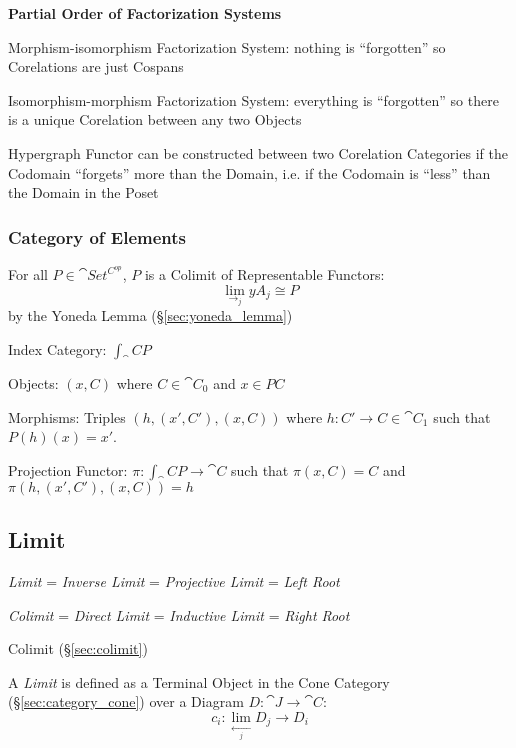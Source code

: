 \textbf{Partial Order of Factorization Systems} %

Morphism-isomorphism Factorization System: nothing is ``forgotten'' so
Corelations are just Cospans

Isomorphism-morphism Factorization System: everything is ``forgotten''
so there is a unique Corelation between any two Objects

Hypergraph Functor can be constructed between two Corelation
Categories if the Codomain ``forgets'' more than the Domain, i.e. if
the Codomain is ``less'' than the Domain in the Poset



\subsubsection{Category of Elements}\label{sec:element_category}

For all $P \in \cat{Set^{C^{op}}}$, $P$ is a Colimit of
Representable Functors:
\[
  \lim_{\rightarrow_j} yA_j \cong P
\]
by the Yoneda Lemma (\S\ref{sec:yoneda_lemma})

Index Category: $\int_\cat{C} P$

Objects: $(x,C)$ where $C \in \cat{C}_0$ and $x \in PC$

Morphisms: Triples $(h, (x',C'), (x,C))$ where $h : C' \rightarrow C
\in \cat{C}_1$ such that $P(h)(x) = x'$.

Projection Functor: $\pi : \int_\cat{C} P \rightarrow \cat{C}$
such that $\pi(x,C) = C$ and $\pi(h, (x',C'), (x,C)) = h$



\subsection{Limit}\label{sec:limit}

\emph{Limit} = \emph{Inverse Limit} = \emph{Projective Limit} =
\emph{Left Root}

\emph{Colimit} = \emph{Direct Limit} = \emph{Inductive Limit} =
\emph{Right Root}

Colimit (\S\ref{sec:colimit})

A \emph{Limit} is defined as a Terminal Object in the Cone Category
(\S\ref{sec:category_cone}) over a Diagram $D : \cat{J} \rightarrow
\cat{C}$:
\[
  c_i : \lim_{\xleftarrow[j]{}} D_j \rightarrow D_i
\]

